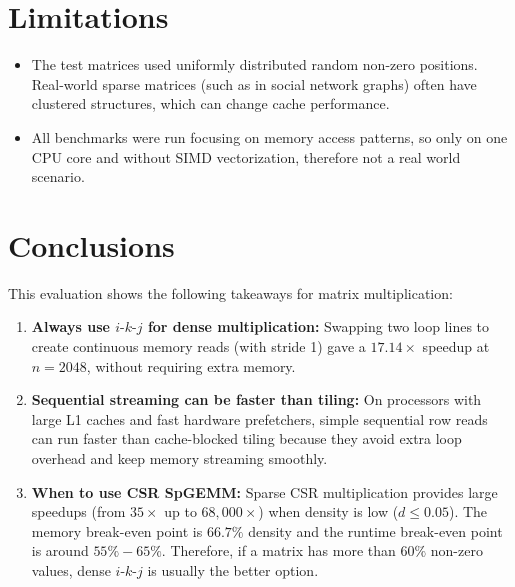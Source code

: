 \documentclass[10pt,conference,a4paper]{IEEEtran}
\begin{document}
\section{Limitations}
\begin{itemize}
    \item The test matrices used uniformly distributed random non-zero positions. 
    Real-world sparse matrices (such as in social network graphs) often have clustered structures, which can change cache performance.
    \item All benchmarks were run focusing on memory access patterns, so only on one CPU core and without SIMD vectorization, therefore not a real world scenario.
\end{itemize}

\section{Conclusions}
This evaluation shows the following takeaways for matrix multiplication:
\begin{enumerate}
    \item \textbf{Always use $i\text{-}k\text{-}j$ for dense multiplication:} Swapping two loop lines to create continuous memory reads (with stride 1) gave a $17.14\times$ speedup at $n=2048$, without requiring extra memory.
    \item \textbf{Sequential streaming can be faster than tiling:} On processors with large L1 caches and fast hardware prefetchers, simple sequential row reads can run faster than cache-blocked tiling because they avoid extra loop overhead and keep memory streaming smoothly.
    \item \textbf{When to use CSR SpGEMM:} Sparse CSR multiplication provides large speedups (from $35\times$ up to $68{,}000\times$) when density is low ($d \le 0.05$). 
    The memory break-even point is $66.7\%$ density and the runtime break-even point is around $55\% - 65\%$. 
    Therefore, if a matrix has more than $60\%$ non-zero values, dense $i\text{-}k\text{-}j$ is usually the better option.
\end{enumerate}
\end{document}
